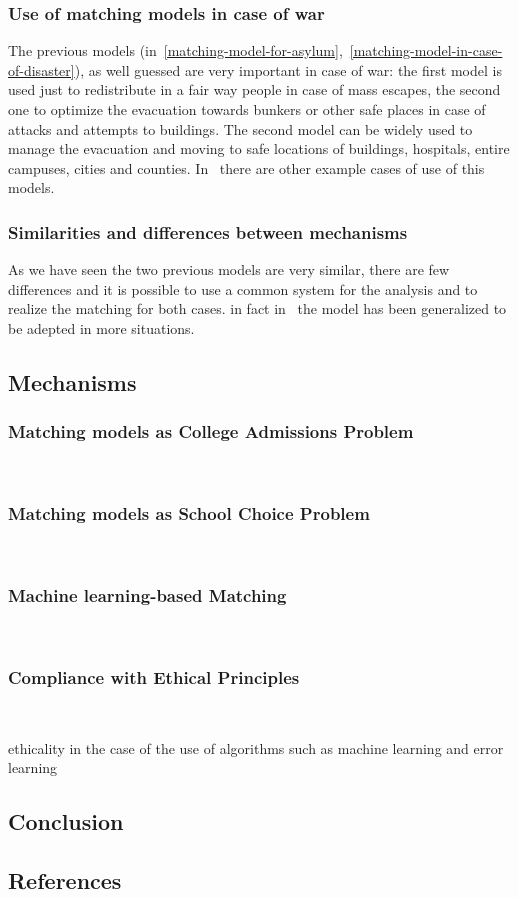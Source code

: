 \documentclass[letterpaper]{article} %
\begin{document}
    \subsubsection{Use of matching models in case of war}\label{use-of-matching-model-in-case-of-war}%
    The previous models (in~\ref{matching-model-for-asylum},~\ref{matching-model-in-case-of-disaster}), as well guessed are very important in case of war: the first model is used just
    to redistribute in a fair way people in case of mass escapes, the second one to optimize the evacuation
    towards bunkers or other safe places in case of attacks and attempts to buildings.
    The second model can be widely used to manage the evacuation and moving to safe locations of buildings, hospitals,
    entire campuses, cities and counties.
    In~\citet{delacretaz_2020,delacretaz_2019,delacretaz_2016}   there are other example cases of use of this models.

    \subsubsection{Similarities and differences between mechanisms}

    As we have seen the two previous models are very similar, there are few differences and it is possible to use a
    common system for the analysis and to realize the matching for both cases.
    in fact in~\citet{delacretaz_2020} the model has been generalized to be adepted in more situations.

    \subsection{Mechanisms}

    \subsubsection{Matching models as College Admissions Problem}~\citet{basshuysen}

    \subsubsection{Matching models as School Choice Problem}~\citet{basshuysen}

    \subsubsection{Machine learning-based Matching}~\citet{olbergml}

    \subsubsection{Compliance with Ethical Principles}~\citet{basshuysen}

    ethicality in the case of the use of algorithms such as machine learning and error learning

    \subsection{Conclusion}

    \subsection{References}


    
\end{document}
